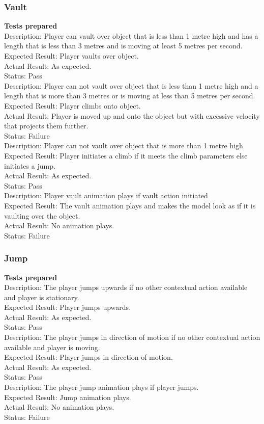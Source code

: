 \documentclass[11pt,a4paper]{article}
\begin{document}
\subsubsection{Vault}
\textbf{Tests prepared}\\
Description: Player can vault over object that is less than 1 metre high and has a length that is less than 3 metres and is moving at least 5 metres per second. \\
Expected Result: Player vaults over object.\\
Actual Result:  As expected.\\
Status: Pass
\smallskip\\
Description: Player can not vault over object that is less than 1 metre high and a length that is more than 3 metres or is moving at less than 5 metres per second. \\
Expected Result: Player climbs onto object.\\
Actual Result:  Player is moved up and onto the object but with excessive velocity that projects them further.\\
Status: Failure
\smallskip\\
Description: Player can not vault over object that is more than 1 metre high\\
Expected Result: Player initiates a climb if it meets the climb parameters else initiates a jump.\\
Actual Result: As expected.\\
Status: Pass
\smallskip\\
Description: Player vault animation plays if vault action initiated\\
Expected Result: The vault animation plays and makes the model look as if it is vaulting over the object.\\
Actual Result:  No animation plays.\\
Status: Failure
\subsubsection{Jump}
\textbf{Tests prepared}\\
Description: The player jumps upwards if no other contextual action available and player is stationary. \\
Expected Result: Player jumps upwards.\\
Actual Result:  As expected.\\
Status: Pass
\smallskip\\
Description: The player jumps in direction of motion if no other contextual action available and player is moving. \\
Expected Result: Player jumps in direction of motion.\\
Actual Result: As expected.\\
Status: Pass
\smallskip\\
Description: The player jump animation plays if player jumps. \\
Expected Result: Jump animation plays.\\
Actual Result:  No animation plays.\\
Status: Failure
\end{document}

